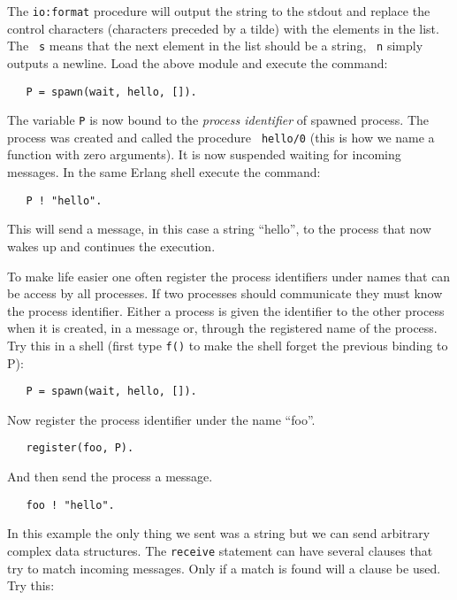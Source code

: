 \documentclass[a4paper, 11pt]{article}
\begin{document}
\noindent The {\tt io:format} procedure will output the string to the stdout and
replace the control characters (characters preceded by a tilde) with
the elements in the list. The {\tt ~s} means that the next element in
the list should be a string, {\tt ~n} simply outputs a newline. Load
the above module and execute the command:

\begin{verbatim}
   P = spawn(wait, hello, []).
\end{verbatim}

\noindent The variable {\tt P} is now bound to the {\em process identifier} of
spawned process. The process was created and called the procedure {\tt
  hello/0} (this is how we name a function with zero arguments). It is
now suspended waiting for incoming messages. In the same Erlang shell
execute the command:

\begin{verbatim}
   P ! "hello".
\end{verbatim}

\noindent This will send a message, in this case a string ``hello'', to the
process that now wakes up and continues the execution.

To make life easier one often register the process identifiers under
names that can be access by all processes. If two processes should
communicate they must know the process identifier. Either a process is
given the identifier to the other process when it is created, in a
message or, through the registered name of the process. Try this in a
shell (first type {\tt f()} to make the shell forget the previous
binding to P):

\begin{verbatim}
   P = spawn(wait, hello, []).
\end{verbatim}

\noindent Now register the process identifier under the name ``foo''.

\begin{verbatim}
   register(foo, P).
\end{verbatim}

\noindent And then send the process a message.

\begin{verbatim}
   foo ! "hello".
\end{verbatim}

\noindent In this example the only thing we sent was a string but we can send
arbitrary complex data structures. The {\tt receive} statement can
have several clauses that try to match incoming messages. Only if a
match is found will a clause be used. Try this:
\end{document}
